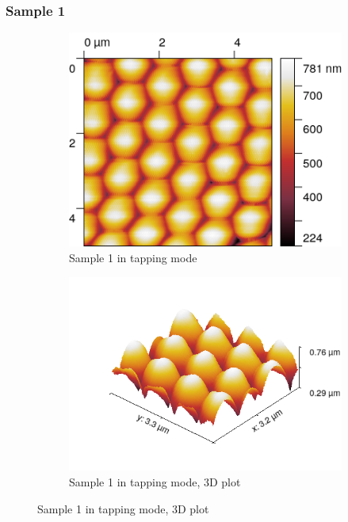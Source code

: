 \documentclass[11pt,a4paper]{article}
\begin{document}
\subsubsection{Sample 1}

\begin{figure}[H]
\centering
\begin{subfigure}[b]{0.45\textwidth}
\includegraphics[width=\textwidth]{tm_sample1}
\caption{Sample 1 in tapping mode}
\label{fig:}
\end{subfigure}
\begin{subfigure}[b]{0.45\textwidth}
\includegraphics[width=\textwidth]{tm_sample1_3D}
\caption{Sample 1 in tapping mode, 3D plot}
\label{fig:}
\end{subfigure}
\end{figure}
\end{document}
